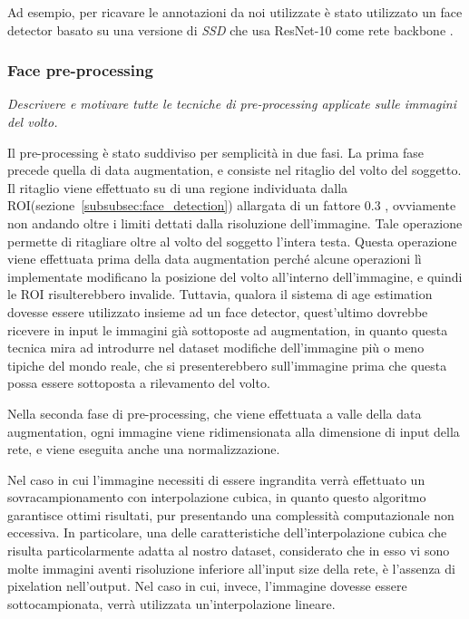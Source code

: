 Ad esempio, per ricavare le annotazioni da noi utilizzate è stato utilizzato un face detector basato su una versione di \emph{SSD} che usa ResNet-10 come rete backbone \cite{miviagender}.

\subsubsection{Face pre-processing} 

\emph{Descrivere e motivare tutte le tecniche di pre-processing applicate sulle immagini del volto.}

Il pre-processing è stato suddiviso per semplicità in due fasi. La prima fase precede quella di data augmentation, e consiste nel ritaglio del volto del soggetto. Il ritaglio viene effettuato su di una regione individuata dalla ROI(sezione~\ref{subsubsec:face_detection}) allargata di un fattore $0.3$ \cite{vggface2dataset}, ovviamente non andando oltre i limiti dettati dalla risoluzione dell'immagine. Tale operazione permette di ritagliare oltre al volto del soggetto l'intera testa. Questa operazione viene effettuata prima della data augmentation perché alcune operazioni lì implementate modificano la posizione del volto all'interno dell'immagine, e quindi le ROI risulterebbero invalide. Tuttavia, qualora il sistema di age estimation dovesse essere utilizzato insieme ad un face detector, quest'ultimo dovrebbe ricevere in input le immagini già sottoposte ad augmentation, in quanto questa tecnica mira ad introdurre nel dataset modifiche dell'immagine più o meno tipiche del mondo reale, che si presenterebbero sull'immagine prima che questa possa essere sottoposta a rilevamento del volto.

Nella seconda fase di pre-processing, che viene effettuata a valle della data augmentation, ogni immagine viene ridimensionata alla dimensione di input della rete, e viene eseguita anche una normalizzazione. 

Nel caso in cui l'immagine necessiti di essere ingrandita verrà effettuato un sovracampionamento con interpolazione cubica, in quanto questo algoritmo garantisce ottimi risultati, pur presentando una complessità computazionale non eccessiva. In particolare, una delle caratteristiche dell'interpolazione cubica che risulta particolarmente adatta al nostro dataset, considerato che in esso vi sono molte immagini aventi risoluzione inferiore all'input size della rete, è l'assenza di pixelation nell'output.
Nel caso in cui, invece, l'immagine dovesse essere sottocampionata, verrà utilizzata un'interpolazione lineare. 

